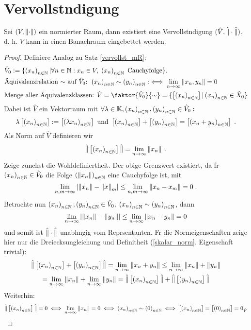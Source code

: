 \section{Vervollst\as ndigung}

\begin{theorem}
	Sei \((V,\norm\cdot)\) ein normierter Raum, dann existiert eine Vervollst\as ndigung \((\hat V, \hnorm\cdot)\), d. h. $V$ kann in einen Banachraum eingebettet werden.
\end{theorem}
\begin{proof} 
	Definiere Analog zu Satz \ref{vervollst_mR}:
	\begin{align*}
		&\hat V_0 := \{\seq x n \vert \forall n \in \N: x_n \in V, \; \seq x n \text{ Cauchyfolge}\}.\\
	&\text{\As quivalenzrelation $\sim$ auf $\hat V_0$: } 
	\seq xn \sim \seq yn :\iff \lim_{n\to\infty} \norm{x_n, y_n} = 0\\
	&\text{Menge aller \As quivalenzklassen: }
	\hat V = \faktor{\hat V_0}{\sim} = \{\equ{\seq xn} \vert \seq xn \in \hat X_0\} 
	\end{align*}
	Dabei ist \(\hat V\) ein Vektorraum mit \(\forall \lambda \in \K, \seq xn, \seq yn\in \hat V_0:\)
	\[\lambda \equ{\seq xn} := \equ{\seq{\lambda x}{n}}\text{ und } \equ{\seq xn} + \equ{\seq yn} = \equ{\se{x_n + y_n}{n}}\;.\]
	Als Norm auf \(\hat V\) definieren wir 
	\[\hnorm{\equ{\seq xn}} = \lime n \norm{x_n}\;.\]
	Zeige zun\as chst die Wohldefiniertheit. Der obige Grenzwert existiert, da f\us r \(\seq xn \in \hat V_0\) die Folge \(\se{\norm{x_n}}{n}\) eine Cauchyfolge ist, mit
	\[\lim_{n,m \to\infty} \ab{\norm{x_n} - \norm x_m} \leq \lim_{n,m\to\infty}\norm{x_n - x_m} = 0 \;.\]
	Betrachte nun \(\seq xn, \seq yn \in \hat V_0, \; \seq xn \sim \seq yn\), dann
	\[\lime n\ab{\norm{x_n} - \norm{y_n}} \leq \lime n \norm{x_n -y_n}  = 0 \]
	und somit ist \(\hnorm \cdot\) unabh\as ngig vom Repr\as sentanten. F\us r die Normeigenschaften zeige hier nur die Dreiecksungleichung und Definitheit (\ref{skalar_norm}. Eigenschaft trivial):
	\begin{multline*}\hnorm{\equ{\seq xn} + \equ{\seq yn}} = \lime n \norm{x_n + y_n} \leq \lime n \norm{x_n} + \norm{y_n} \\= \lime n \norm{x_n} + \lime n \norm{y_n} = \hnorm{\equ{\seq xn}} + \hnorm{ \equ{\seq yn}}\end{multline*}
	Weiterhin:
		\[\hnorm{\equ{\seq xn}} = 0 \iff \lime n \norm{x_n} = 0 \iff \seq xn \sim \se{0}{n} \iff \equ{\seq xn} = \equ{\se{0}{n}} = 0_{\hat V}\]
\end{proof}

